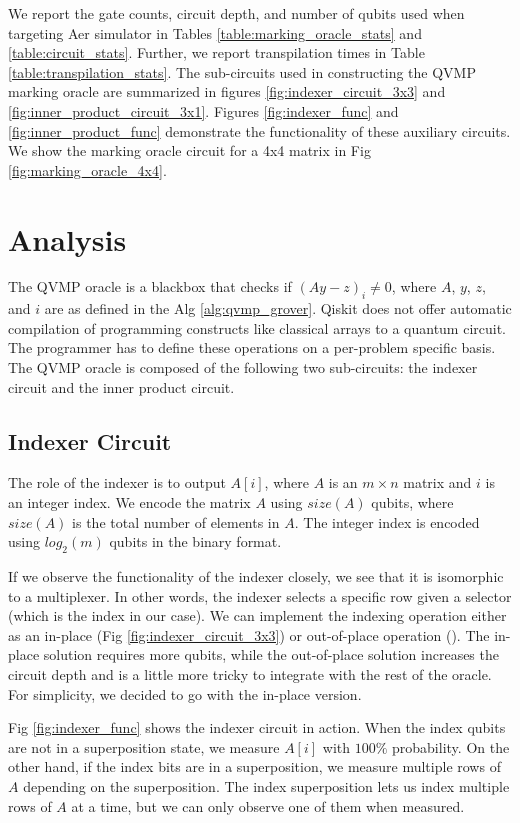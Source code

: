 \documentclass[10pt]{proc}
\theoremstyle{definition}
\theoremstyle{remark}
\begin{document}
We report the gate counts, circuit depth, and number of qubits used when
targeting Aer simulator in Tables \ref{table:marking_oracle_stats} and
\ref{table:circuit_stats}. Further, we report transpilation times in Table
\ref{table:transpilation_stats}. The sub-circuits used in constructing the
QVMP marking oracle are summarized in figures
\ref{fig:indexer_circuit_3x3} and \ref{fig:inner_product_circuit_3x1}.
Figures \ref{fig:indexer_func} and \ref{fig:inner_product_func}
demonstrate the functionality of these auxiliary circuits. We show the
marking oracle circuit for a 4x4 matrix in Fig
\ref{fig:marking_oracle_4x4}.

\section{Analysis} \label{sec:analysis}

The QVMP oracle is a blackbox that checks if $(Ay - z)_i \neq 0$, where $A$,
$y$, $z$, and $i$ are as defined in the Alg \ref{alg:qvmp_grover}. Qiskit does
not offer automatic compilation of programming constructs like classical arrays to a
quantum circuit. The programmer has to define these operations on a per-problem
specific basis. The QVMP oracle is composed of the following two sub-circuits:
the indexer circuit and the inner product circuit.

\subsection{Indexer Circuit}


The role of the indexer is to output $A[i]$, where $A$ is an $m \times n$
matrix and $i$ is an integer index. We encode the matrix $A$ using
$size(A)$ qubits, where $size(A)$ is the total number of elements in $A$.
The integer index is encoded using $log_2(m)$ qubits in the binary format.

If we observe the functionality of the indexer closely, we see that
it is isomorphic to a multiplexer. In other words, the indexer
selects a specific row given a selector (which is the index in our
case). We can implement the indexing operation either as an in-place
(Fig \ref{fig:indexer_circuit_3x3}) or out-of-place operation
(\cite{roy_synthesis_2012}). The in-place solution requires more qubits, while
the out-of-place solution increases the circuit depth and is a little more
tricky to integrate with the rest of the oracle. For simplicity, we decided to
go with the in-place version.
      
Fig \ref{fig:indexer_func} shows the indexer circuit in action. When the index
qubits are not in a superposition state, we measure $A[i]$ with $100\%$
probability. On the other hand, if the index bits are in a superposition, we
measure multiple rows of $A$ depending on the superposition. The index
superposition lets us index multiple rows of $A$ at a time, but we can only
observe one of them when measured.
\end{document}
